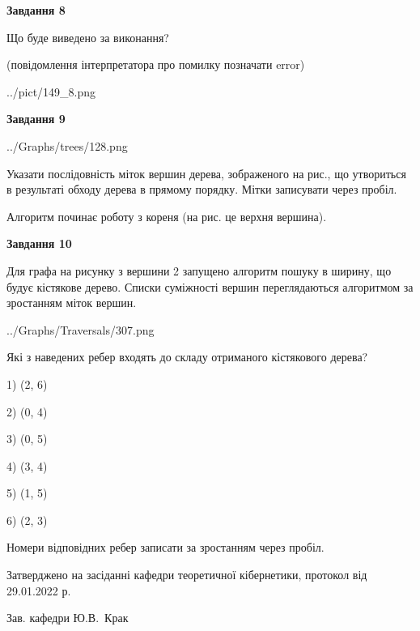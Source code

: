 \documentclass[12pt, ukrainian]{article}
\begin{document}
{\begin {large}
{\begin {center}\textbf{Завдання 8}\end {center}}\par
Що буде виведено за виконання?\par
 (повідомлення інтерпретатора про помилку позначати error)\par
\begin{center}
	{../pict/149_8.png}
\end{center}
\newpage

{\begin {center}\textbf{Завдання 9}\end {center}}\par

\begin{center}
	{../Graphs/trees/128.png}
\end{center}
Указати послідовність міток вершин дерева, зображеного на рис., що утвориться в результаті обходу дерева в прямому порядку. Мітки записувати через пробіл.\par Алгоритм починає роботу з кореня (на рис. це верхня вершина).\par
\newpage

{\begin {center}\textbf{Завдання 10}\end {center}}\par
Для графа на рисунку з вершини 2 запущено алгоритм пошуку в ширину, що будує кістякове дерево. Списки суміжності вершин переглядаються алгоритмом за зростанням міток вершин.\par
\begin{center}
	{../Graphs/Traversals/307.png}
\end{center}
\par Які з наведених ребер входять до складу отриманого кістякового дерева?\par
1) (2, 6)\par
2) (0, 4)\par
3) (0, 5)\par
4) (3, 4)\par
5) (1, 5)\par
6) (2, 3)\par
{\vskip 15pt} Номери відповідних ребер записати за зростанням через пробіл.\par
\newpage


\end {large}
}
{\smallskip \begin {small} Затверджено на засіданні кафедри теоретичної кібернетики, протокол  від   29.01.2022 р.\par\smallskip\smallskip
{\parbox {6.5 cm}{Зав. кафедри \dotfill Ю.В.~Крак}} \end{small}}
\end{document}
